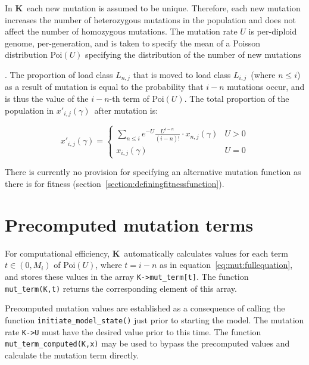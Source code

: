 \documentclass[12pt,twoside,letterpaper,fleqn]{report}
\numberwithin{equation}{section}  %
\newcommand{\K}{{\bf K}}
\newcommand{\ProbDist}[2]{\mbox{{#1}$(#2)$}}
\newcommand{\Mi}{\mbox{$M_{i}$}}
\newcommand{\xijg}{\mbox{$x_{i,j}(\gamma)$}}
\newcommand{\xnjg}{\mbox{$x_{n,j}(\gamma)$}}
\newcommand{\xpijg}{\mbox{$x'_{i,j}(\gamma)$}}
\newcommand{\Lij}{\mbox{$L_{i,j}$}}              %
\begin{document}
In \K\ each new mutation is assumed to be unique.  Therefore, each new mutation
increases the number of heterozygous mutations in the population and does not
affect the number of homozygous mutations.  The mutation rate $U$ is
per-diploid genome, per-generation, and is taken to specify the mean of a
Poisson distribution \ProbDist{Poi}{U} specifying the distribution of the
number of new mutations {\cite[and many
others]{Kondrashov:1985:5375,Charlesworth:1990:5337}.  The proportion of load
class $L_{n,j}$ that is moved to load class \Lij\ (where $n \le i$) as a result
of mutation is equal to the probability that $i-n$ mutations occur, and is thus
the value of the $i-n$-th term of \ProbDist{Poi}{U}.  The total proportion of
the population in \xpijg\ after mutation is:

\begin{equation}\label{eq:mut:fullequation}
    \xpijg = 
    \begin{cases}
        \sum_{n \le i}{e^{-U} \frac{U^{i-n}}{(i-n)!} \cdot \xnjg} & U > 0 \\
        \xijg & U = 0
    \end{cases}
\end{equation}

There is currently no provision for specifying an alternative mutation function
as there is for fitness (section~\ref{section:definingfitnessfunction}).

\section{Precomputed mutation terms}
\label{section:precomputedmutation}

For computational efficiency, \K\ automatically calculates values for each term
$t\in(0,\Mi)$ of \ProbDist{Poi}{U}, where $t=i-n$ as in
equation~\eqref{eq:mut:fullequation}, and stores these values in the array
\lstinline{K->mut_term[t]}.  The function \lstinline{mut_term(K,t)} returns the
corresponding element of this array.

\sloppy Precomputed mutation values are established as a consequence of calling
the function \lstinline{initiate_model_state()} just prior to starting the
model.  The mutation rate \lstinline{K->U} must have the desired value prior to
this time.  The function \lstinline{mut_term_computed(K,x)} may be used to
bypass the precomputed values and calculate the mutation term directly.

}
\end{document}
